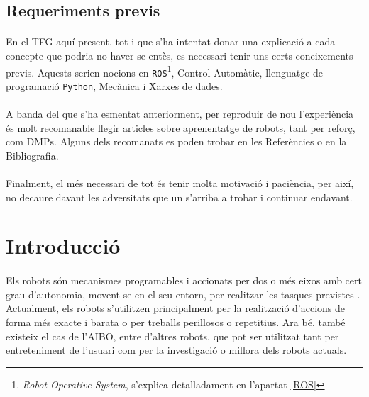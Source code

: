 \documentclass[12pt,a4paper,final,twoside]{article}
\begin{document}
\label{Requeriments}
\subsection*{Requeriments previs}

\paragraph{}En el TFG aquí present, tot i que s'ha intentat donar una explicació a cada concepte que podria no haver-se entès, es necessari tenir uns certs coneixements previs. Aquests serien nocions en \texttt{ROS}\footnote{\textit{Robot Operative System}, s'explica detalladament en l'apartat \ref{ROS}}, Control Automàtic, llenguatge de programació \texttt{Python}, Mecànica i Xarxes de dades.

\paragraph{}A banda del que s'ha esmentat anteriorment, per reproduir de nou l'experiència és molt recomanable llegir articles sobre aprenentatge de robots, tant per reforç, com DMPs. Alguns dels recomanats es poden trobar en les Referències o en la Bibliografia.

\paragraph{}Finalment, el més necessari de tot és tenir molta motivació i paciència, per així, no decaure davant les adversitats que un s'arriba a trobar i continuar endavant.

\newpage
\label{Introduccio}
\section*{Introducció}

\paragraph{}Els robots són mecanismes programables i accionats per dos o més eixos amb cert grau d'autonomia, movent-se en el seu entorn, per realitzar les tasques previstes \cite{ISO_Robot}. Actualment, els robots s'utilitzen principalment per la realització d'accions de forma més exacte i barata o per treballs perillosos o repetitius. Ara bé, també existeix el cas de l'AIBO, entre d'altres robots, que pot ser utilitzat tant per entreteniment de l'usuari com per la investigació o millora dels robots actuals.
\end{document}

